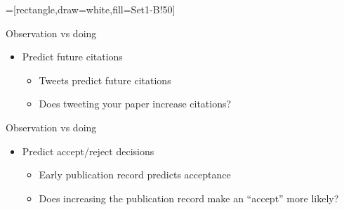 \documentclass[aspectratio=169,notes=hide,compress]{beamer}
\begin{document}
=[rectangle,draw=white,fill=Set1-B!50]
\begin{frame}[c]{Observation vs doing}

  \begin{itemize}
    \item Predict future citations
    \begin{itemize}
      \item Tweets predict future citations
      \item<2-> Does tweeting your paper increase citations?
    \end{itemize}
  \end{itemize}
  \vskip2cm

  \begin{overlayarea}{\textwidth}{3cm}
    \begin{center}
    \end{center}
  \end{overlayarea}
\end{frame}

\begin{frame}[c]{Observation vs doing}

  \begin{itemize}
    \item Predict accept/reject decisions
    \begin{itemize}
      \item Early publication record predicts acceptance
      \item<2-> Does increasing the publication record make an ``accept'' more likely?
    \end{itemize}
  \end{itemize}
  \vskip2cm

  \begin{overlayarea}{\textwidth}{3cm}
    \begin{center}
    \end{center}
  \end{overlayarea}
\end{frame}
\end{document}
